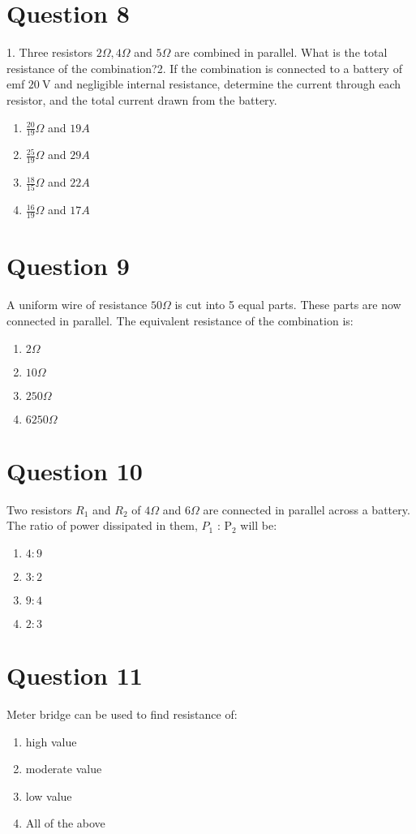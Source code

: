 \documentclass{article}
\begin{document}
\section*{Question 8}
1. Three resistors \(2 \Omega, 4 \Omega\) and \(5 \Omega\) are combined in parallel. What is the total resistance of the combination?2. If the combination is connected to a battery of emf \(20 \mathrm{~V}\) and negligible internal resistance, determine the current through each resistor, and the total current drawn from the battery.
\begin{enumerate}[label=(\alph*)]
\item \(\frac{20}{19} \Omega\) and \(19A\)
\item \(\frac{25}{19} \Omega\) and \(29A\)\newline
\item \(\frac{18}{15} \Omega\) and \(22A\)\newline
\item \(\frac{16}{19} \Omega\) and \(17A\)\newline
\end{enumerate}
\newpage
\section*{Question 9}
A uniform wire of resistance \(50 \Omega\) is cut into 5 equal parts. These parts are now connected in parallel. The equivalent resistance of the combination is:
\begin{enumerate}[label=(\alph*)]
\item \(2 \Omega\)
\item \(10 \Omega\)
\item \(250 \Omega\)
\item \(6250 \Omega\)
\end{enumerate}
\newpage
\section*{Question 10}
Two resistors \(R_{1}\) and \(R_{2}\) of \(4 \Omega\) and \(6 \Omega\) are connected in parallel across a battery. The ratio of power dissipated in them, \(P_{1}\) : \(\mathrm{P}_{2}\) will be:
\begin{enumerate}[label=(\alph*)]
\item \(4: 9\)
\item \(3: 2\)
\item \(9: 4\)
\item \(2: 3\)
\end{enumerate}
\newpage
\section*{Question 11}
Meter bridge can be used to find resistance of:
\begin{enumerate}[label=(\alph*)]
\item high value
\item moderate value
\item low value
\item All of the above
\end{enumerate}
\newpage
\end{document}
